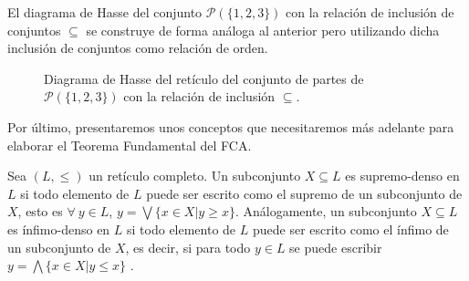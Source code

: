 \documentclass[oneside,openright,titlepage,numbers=noenddot,openany,headinclude,footinclude=true,
cleardoublepage=empty,abstractoff,BCOR=5mm,paper=a4,fontsize=12pt,main=spanish]{scrreprt}
\begin{document}
\begin{exampleth}El diagrama de Hasse del conjunto $\mathcal{P}(\{1,2,3\})$ con la relación de inclusión de conjuntos $\subseteq$ se construye de forma análoga al anterior pero utilizando dicha inclusión de conjuntos como relación de orden.

\begin{figure}[H]
\centering
\caption{Diagrama de Hasse del retículo del conjunto de partes de $\mathcal{P}(\{1,2,3\})$ con la relación de inclusión $\subseteq$.}
\end{figure}

\end{exampleth}
Por último, presentaremos unos conceptos que necesitaremos más adelante para elaborar el Teorema Fundamental del FCA.

\begin{definition} 
Sea $(L,\leq)$ un retículo completo. Un subconjunto $X \subseteq L$ es supremo-denso en $L$ si todo elemento de $L$ puede ser escrito como el supremo de un subconjunto de $X$, esto es $\forall \ y \in L$, $y=\bigvee \{ x \in X | y \geq x\}$. Análogamente, un subconjunto $X \subseteq L$ es ínfimo-denso en $L$ si todo elemento de $L$ puede ser escrito como el ínfimo de un subconjunto de $X$, es decir, si para todo $y \in L$ se puede escribir $y = \bigwedge \{ x \in X | y \leq x\}$ .
\end{definition}
\end{document}
